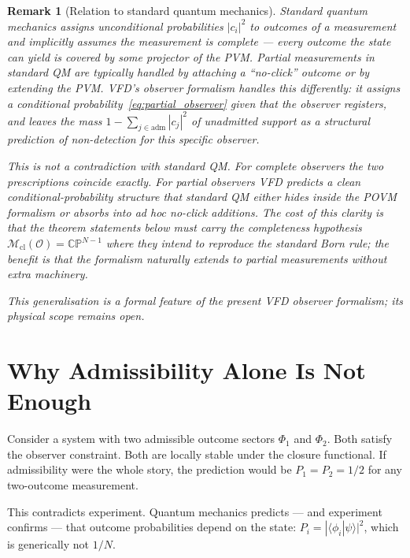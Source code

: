 \documentclass[12pt]{article}
\newtheorem{remark}[theorem]{Remark}
\newcommand{\Ocal}{\mathcal{O}}
\newcommand{\Mcl}{\mathcal{M}_{\mathrm{cl}}}
\begin{document}
\begin{remark}[Relation to standard quantum mechanics]\label{rem:vs_standard_qm}
Standard quantum mechanics assigns unconditional probabilities $|c_i|^2$ to outcomes of a measurement and implicitly assumes the measurement is complete --- every outcome the state can yield is covered by some projector of the PVM. Partial measurements in standard QM are typically handled by attaching a ``no-click'' outcome or by extending the PVM. VFD's observer formalism handles this differently: it assigns a conditional probability~\eqref{eq:partial_observer} given that the observer registers, and leaves the mass $1 - \sum_{j \in \mathrm{adm}}|c_j|^2$ of unadmitted support as a structural prediction of \emph{non-detection} for this specific observer.

This is not a contradiction with standard QM. For complete observers the two prescriptions coincide exactly. For partial observers VFD predicts a clean conditional-probability structure that standard QM either hides inside the POVM formalism or absorbs into ad hoc no-click additions. The cost of this clarity is that the theorem statements below must carry the completeness hypothesis $\Mcl(\Ocal) = \mathbb{CP}^{N-1}$ where they intend to reproduce the standard Born rule; the benefit is that the formalism naturally extends to partial measurements without extra machinery.

This generalisation is a formal feature of the present VFD observer formalism; its physical scope remains open.
\end{remark}

\section{Why Admissibility Alone Is Not Enough}\label{sec:gap}

Consider a system with two admissible outcome sectors $\Phi_1$ and $\Phi_2$. Both satisfy the observer constraint. Both are locally stable under the closure functional. If admissibility were the whole story, the prediction would be $P_1 = P_2 = 1/2$ for any two-outcome measurement.

This contradicts experiment. Quantum mechanics predicts --- and experiment confirms --- that outcome probabilities depend on the state: $P_i = |\langle \phi_i | \psi \rangle|^2$, which is generically not $1/N$.
\end{document}
